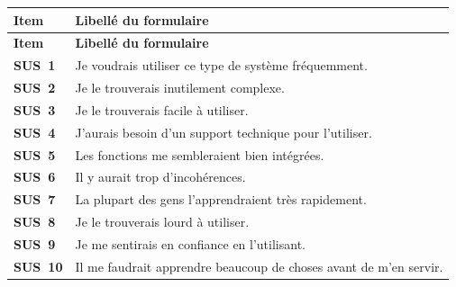 {\small
\renewcommand{\arraystretch}{1.18}
\setlength{\tabcolsep}{4pt}
\begin{xltabular}{\textwidth}{|>{\bfseries}l|>{\raggedright\arraybackslash}X|}
\hline
{}
\textbf{Item} & \textbf{Libellé du formulaire} \\
\hline
\endfirsthead
\hline
{}
\textbf{Item} & \textbf{Libellé du formulaire} \\
\hline
\endhead
\endfoot
\endlastfoot
SUS~1 & Je voudrais utiliser ce type de système fréquemment. \\
\hline
SUS~2 & Je le trouverais inutilement complexe. \\
\hline
SUS~3 & Je le trouverais facile à utiliser. \\
\hline
SUS~4 & J'aurais besoin d'un support technique pour l'utiliser. \\
\hline
SUS~5 & Les fonctions me sembleraient bien intégrées. \\
\hline
SUS~6 & Il y aurait trop d'incohérences. \\
\hline
SUS~7 & La plupart des gens l'apprendraient très rapidement. \\
\hline
SUS~8 & Je le trouverais lourd à utiliser. \\
\hline
SUS~9 & Je me sentirais en confiance en l'utilisant. \\
\hline
SUS~10 & Il me faudrait apprendre beaucoup de choses avant de m'en servir. \\
\hline
\end{xltabular}
\label{tab:annexe-enquete-sus}
}

